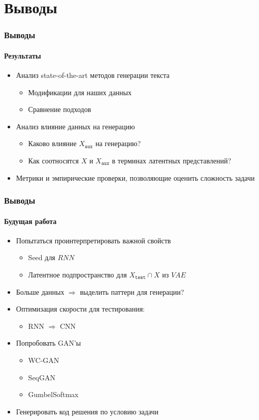 \documentclass[10pt]{beamer}
\newcommand\TODO[1]{\textcolor{red}{{\Large TODO: #1}}}
\newcommand{\X}[1]{X_{\texttt{#1}}}
\newcommand{\Xaux}{\X{aux}}
\newcommand{\Xtest}{\X{test}}
\begin{document}
\section{Выводы}
\begin{frame}
\frametitle{Выводы}
\framesubtitle{Результаты}

\begin{itemize}
    \item Анализ state-of-the-art методов генерации текста
        \begin{itemize}
            \item Модификации для наших данных
            \item Сравнение подходов
        \end{itemize}
    \item Анализ влияние данных на генерацию
    \begin{itemize}
        \item Каково влияние $\Xaux$ на генерацию?
        \item Как соотносятся $X$ и $\Xaux$ в терминах латентных представлений?
    \end{itemize}
    \item Метрики и эмпирические проверки, позволяющие оценить сложность задачи
\end{itemize}


\end{frame}
\begin{frame}
\frametitle{Выводы}
\framesubtitle{Будущая работа}

\begin{itemize}
    \item Попытаться проинтерпретировать важной свойств
    \begin{itemize}
        \item Seed для $RNN$
        \item Латентное подпространство для $\Xtest \cap X$ из $VAE$
    \end{itemize}
    \item Больше данных $\Rightarrow$ выделить паттерн для генерации?
    \item Оптимизация скорости для тестирования:
    \begin{itemize}
        \item RNN $\Rightarrow$ CNN
    \end{itemize}
    \item Попробовать GAN'ы
        \begin{itemize}
            \item WC-GAN
            \item SeqGAN
            \item GumbelSoftmax
        \end{itemize}
    \item Генерировать код решения по условию задачи
\end{itemize}


\end{frame}
\end{document}
